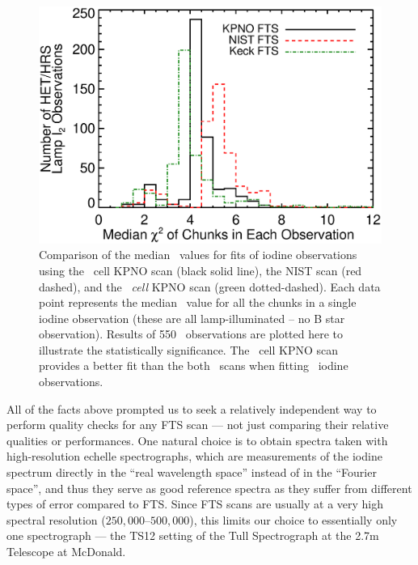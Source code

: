 \begin{figure}[!th]
\centering
\includegraphics[angle=0.,scale=0.38]{het/het_lamp_i2_fits_kpno_nist_keck.eps}
\caption{Comparison of the median \chisq\ values for fits of iodine
  observations using the \het\ cell KPNO scan (black solid line), the
  NIST scan (red dashed), and the {\em \keck\ cell} KPNO scan (green
  dotted-dashed). Each data point represents the median \chisq\ value
  for all the chunks in a single iodine observation (these are all
  lamp-illuminated -- no B star observation). Results of 550
  \het\ observations are plotted here to illustrate the statistically
  significance. The \keck\ cell KPNO scan provides a better fit than the
  both \het\ scans when fitting \het\ iodine observations.
  \label{fig:lampi2fit}}
\end{figure}

All of the facts above prompted us to seek a relatively
independent way to perform quality checks for any FTS scan --- not
just comparing their relative qualities or performances. One
natural choice is to obtain spectra taken with high-resolution echelle
spectrographs, which are measurements of the iodine spectrum directly
in the ``real wavelength space'' instead of in the ``Fourier space'', and
thus they serve as good reference spectra as they suffer from
different types of error compared to FTS. Since FTS scans are usually
at a very high spectral resolution ($250,000$--$500,000$), this limits
our choice to essentially only one spectrograph --- the TS12 setting
of the Tull Spectrograph at the 2.7m Telescope at McDonald.


